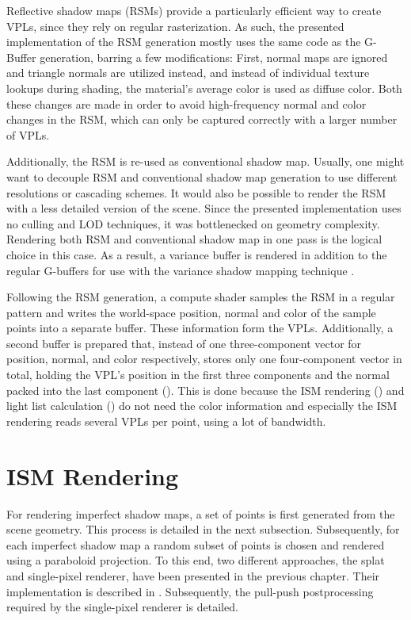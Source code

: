 Reflective shadow maps (RSMs) provide a particularly efficient way to create VPLs, since they rely on regular rasterization. As such, the presented implementation of the RSM generation mostly uses the same code as the G-Buffer generation, barring a few modifications: First, normal maps are ignored and triangle normals are utilized instead, and instead of individual texture lookups during shading, the material's average color is used as diffuse color. Both these changes are made in order to avoid high-frequency normal and color changes in the RSM, which can only be captured correctly with a larger number of VPLs.

Additionally, the RSM is re-used as conventional shadow map. Usually, one might want to decouple RSM and conventional shadow map generation to use different resolutions or cascading schemes. It would also be possible to render the RSM with a less detailed version of the scene. Since the presented implementation uses no culling and LOD techniques, it was bottlenecked on geometry complexity. Rendering both RSM and conventional shadow map in one pass is the logical choice in this case. As a result, a variance buffer is rendered in addition to the regular G-buffers for use with the variance shadow mapping technique \citep{Donnelly:2006:VSM}.

Following the RSM generation, a compute shader samples the RSM in a regular pattern and writes the world-space position, normal and color of the sample points into a separate buffer. These information form the VPLs. Additionally, a second buffer is prepared that, instead of one three-component vector for position, normal, and color respectively, stores only one four-component vector in total, holding the VPL's position in the first three components and the normal packed into the last component (\citet{Cigolle:2014:NormalPacking}). This is done because the ISM rendering () and light list calculation () do not need the color information and especially the ISM rendering reads several VPLs per point, using a lot of bandwidth.


\section{ISM Rendering}
\label{sec:impl:ismRendering}

For rendering imperfect shadow maps, a set of points is first generated from the scene geometry. This process is detailed in the next subsection. Subsequently, for each imperfect shadow map a random subset of points is chosen and rendered using a paraboloid projection. To this end, two different approaches, the splat and single-pixel renderer, have been presented in the previous chapter. Their implementation is described in . Subsequently, the pull-push postprocessing required by the single-pixel renderer is detailed.

